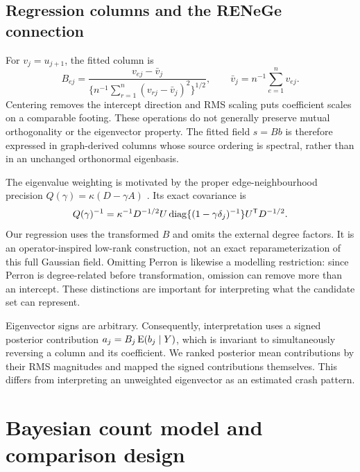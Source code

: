 \documentclass[11pt]{article}
\begin{document}
\subsection{Regression columns and the RENeGe connection}
For $v_j=u_{j+1}$, the fitted column is
\begin{equation}
 B_{ej}=\frac{v_{ej}-\bar v_j}{\{n^{-1}\sum_{r=1}^n(v_{rj}-\bar v_j)^2\}^{1/2}},
 \qquad \bar v_j=n^{-1}\sum_{e=1}^n v_{ej}.
 \label{eq:basis}
\end{equation}
Centering removes the intercept direction and RMS scaling puts coefficient scales on a comparable footing. These operations do not generally preserve mutual orthogonality or the eigenvector property. The fitted field $s=Bb$ is therefore expressed in graph-derived columns whose source ordering is spectral, rather than in an unchanged orthonormal eigenbasis.

The eigenvalue weighting is motivated by the proper edge-neighbourhood precision $Q(\gamma)=\kappa(D-\gamma A)$ \citep{cruzreyes2023spasta}. Its exact covariance is
\begin{equation}
 Q(\gamma)^{-1}=\kappa^{-1}D^{-1/2}U
 \operatorname{diag}\{(1-\gamma\delta_j)^{-1}\}U^{\mathsf T}D^{-1/2}.
\end{equation}
Our regression uses the transformed $B$ and omits the external degree factors. It is an operator-inspired low-rank construction, not an exact reparameterization of this full Gaussian field. Omitting Perron is likewise a modelling restriction: since Perron is degree-related before transformation, omission can remove more than an intercept. These distinctions are important for interpreting what the candidate set can represent.

Eigenvector signs are arbitrary. Consequently, interpretation uses a signed posterior contribution $a_j=B_j\operatorname{E}(b_j\mid Y)$, which is invariant to simultaneously reversing a column and its coefficient. We ranked posterior mean contributions by their RMS magnitudes and mapped the signed contributions themselves. This differs from interpreting an unweighted eigenvector as an estimated crash pattern.

\FloatBarrier
\section{Bayesian count model and comparison design}
\end{document}
